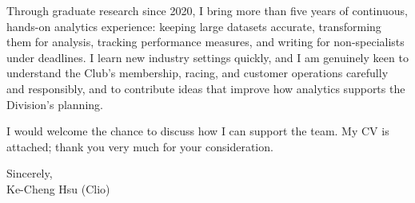 \documentclass[11pt,letterpaper]{article}
\begin{document}
Through graduate research since 2020, I bring more than five years of continuous, hands-on analytics experience: keeping large datasets accurate, transforming them for analysis, tracking performance measures, and writing for non-specialists under deadlines. I learn new industry settings quickly, and I am genuinely keen to understand the Club's membership, racing, and customer operations carefully and responsibly, and to contribute ideas that improve how analytics supports the Division's planning.

I would welcome the chance to discuss how I can support the team. My CV is attached; thank you very much for your consideration.

\vspace{0.7em}
Sincerely,\\[1.0em]
Ke-Cheng Hsu (Clio)
\end{document}
